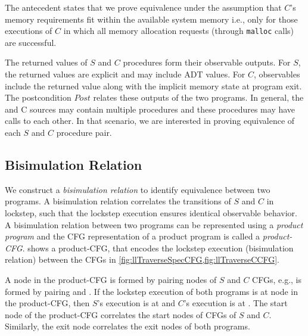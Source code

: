 The \cfits{} antecedent states that we prove equivalence under the assumption that $C$'s memory
requirements fit within the available system memory i.e., only for those executions of $C$
in which all memory allocation requests (through {\tt malloc} calls) are successful.

The returned values of $S$ and $C$ procedures form their observable outputs.
For $S$, the returned values are explicit and may include ADT values.
For $C$, observables include the returned value along with the implicit memory state
at program exit.
The postcondition $Post$ relates these outputs of the two programs.
In general, the \SpecL{} and C sources may contain multiple procedures and these
procedures may have calls to each other.
In that scenario, we are interested in proving equivalence of each $S$ and $C$ procedure pair.



\subsection{Bisimulation Relation}
\label{sec:bisim}
We construct a {\em bisimulation relation} to identify equivalence between two programs.
A bisimulation relation correlates the transitions of $S$ and $C$ in lockstep, such that the
lockstep execution ensures identical observable behavior.
A bisimulation relation between two programs can be represented using a {\em product program}
\cite{covac} and the CFG representation of a product program is called a {\em product-CFG}.
 shows a product-CFG, that encodes the lockstep execution
(bisimulation relation) between the CFGs in \cref{fig:llTraverseSpecCFG,fig:llTraverseCCFG}.

A node in the product-CFG is formed by pairing nodes of $S$ and $C$ CFGs,
e.g.,  is formed by pairing  and .
If the lockstep execution of both programs is at node  in the product-CFG,
then $S$'s execution is at  and $C$'s execution is at .
The start node  of the product-CFG correlates the start nodes of CFGs of $S$ and $C$.
Similarly, the exit node  correlates the exit nodes of both programs.

